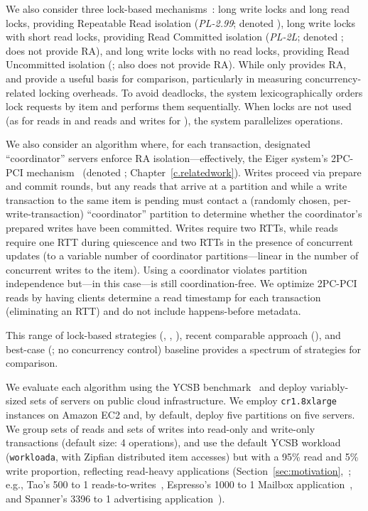 We also consider three lock-based mechanisms~\cite{gray-isolation}: long write locks and
long read locks, providing Repeatable Read
isolation (\textit{PL-2.99}; denoted \lwlr), long write locks with short read
locks, providing Read Committed isolation (\textit{PL-2L}; denoted
\lwsr; does not provide RA), and long write locks with no read locks,
providing Read Uncommitted isolation (\lwnr;
also does not provide RA). While only \lwlr provides RA, \lwsr and
\lwnr provide a useful basis for comparison, particularly in measuring
concurrency-related locking overheads. To avoid deadlocks, the system
lexicographically orders lock requests by item and performs them
sequentially. When locks are not used (as for reads in \lwnr and reads
and writes for \nwnr), the system parallelizes operations.

We also consider an algorithm where, for each transaction, designated
``coordinator'' servers enforce RA isolation---effectively, the Eiger
system's 2PC-PCI mechanism~\cite{eiger} (denoted \mstr;
Chapter~\ref{c.relatedwork}). Writes proceed via prepare and commit
rounds, but any reads that arrive at a partition and while a write
transaction to the same item is pending must contact a (randomly chosen,
per-write-transaction) ``coordinator'' partition to determine whether
the coordinator's prepared writes have been committed. Writes require
two RTTs, while reads require one RTT during quiescence and two RTTs
in the presence of concurrent updates (to a variable number of
coordinator partitions---linear in the number of concurrent writes to
the item). Using a coordinator violates partition independence
but---in this case---is still coordination-free. We optimize 2PC-PCI reads by having
clients determine a read timestamp for each transaction (eliminating
an RTT) and do not include happens-before metadata.

This range of lock-based strategies (\lwnr, \lwsr, \lwnr), recent
comparable approach (\mstr), and best-case (\nwnr; no concurrency
control) baseline provides a spectrum of strategies for comparison.


 We evaluate each algorithm using
the YCSB benchmark~\cite{ycsb} and deploy variably-sized sets of
servers on public cloud infrastructure. We employ \texttt{cr1.8xlarge}
instances on Amazon EC2 and, by default, deploy five partitions on
five servers. We group sets of reads and sets of writes into read-only
and write-only transactions (default size: 4 operations), and use the
default YCSB workload (\texttt{workloada}, with Zipfian distributed
item accesses) but with a 95\% read and 5\% write proportion, reflecting
read-heavy applications
(Section~\ref{sec:motivation},~\cite{tao,eiger,rainbird}; e.g., Tao's
500 to 1 reads-to-writes~\cite{tao,eiger}, Espresso's 1000 to 1
Mailbox application~\cite{espresso}, and Spanner's 3396 to 1
advertising application~\cite{spanner}).

